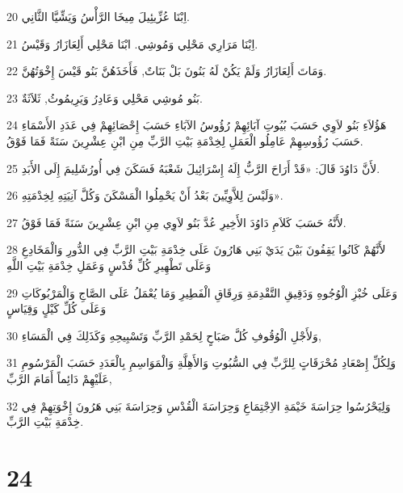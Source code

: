 \par 20 اِبْنَا عُزِّيئِيلَ مِيخَا الرَّأْسُ وَيَشِّيَّا الثَّانِي.
\par 21 اِبْنَا مَرَارِي مَحْلِي وَمُوشِي. ابْنَا مَحْلِي أَلِعَازَارُ وَقَيْسُ.
\par 22 وَمَاتَ أَلِعَازَارُ وَلَمْ يَكُنْ لَهُ بَنُونَ بَلْ بَنَاتٌ, فَأَخَذَهُنَّ بَنُو قَيْسَ إِخْوَتُهُنَّ.
\par 23 بَنُو مُوشِي مَحْلِي وَعَادِرُ وَيَرِيمُوثُ, ثَلاَثَةٌ.
\par 24 هَؤُلاَءِ بَنُو لاَوِي حَسَبَ بُيُوتِ آبَائِهِمْ رُؤُوسُ الآبَاءِ حَسَبَ إِحْصَائِهِمْ فِي عَدَدِ الأَسْمَاءِ حَسَبَ رُؤُوسِهِمْ عَامِلُو الْعَمَلِ لِخِدْمَةِ بَيْتِ الرَّبِّ مِنِ ابْنِ عِشْرِينَ سَنَةً فَمَا فَوْقُ.
\par 25 لأَنَّ دَاوُدَ قَالَ: «قَدْ أَرَاحَ الرَّبُّ إِلَهُ إِسْرَائِيلَ شَعْبَهُ فَسَكَنَ فِي أُورُشَلِيمَ إِلَى الأَبَدِ.
\par 26 وَلَيْسَ لِلاَّوِيِّينَ بَعْدُ أَنْ يَحْمِلُوا الْمَسْكَنَ وَكُلَّ آنِيَتِهِ لِخِدْمَتِهِ».
\par 27 لأَنَّهُ حَسَبَ كَلاَمِ دَاوُدَ الأَخِيرِ عُدَّ بَنُو لاَوِي مِنِ ابْنِ عِشْرِينَ سَنَةً فَمَا فَوْقُ.
\par 28 لأَنَّهُمْ كَانُوا يَقِفُونَ بَيْنَ يَدَيْ بَنِي هَارُونَ عَلَى خِدْمَةِ بَيْتِ الرَّبِّ فِي الدُّورِ وَالْمَخَادِعِ وَعَلَى تَطْهِيرِ كُلِّ قُدْسٍ وَعَمَلِ خِدْمَةِ بَيْتِ اللَّهِ
\par 29 وَعَلَى خُبْزِ الْوُجُوهِ وَدَقِيقِ التَّقْدِمَةِ وَرِقَاقِ الْفَطِيرِ وَمَا يُعْمَلُ عَلَى الصَّاجِ وَالْمَرْبُوكَاتِ وَعَلَى كُلِّ كَيْلٍ وَقِيَاسٍ
\par 30 وَلأَجْلِ الْوُقُوفِ كُلَّ صَبَاحٍ لِحَمْدِ الرَّبِّ وَتَسْبِيحِهِ وَكَذَلِكَ فِي الْمَسَاءِ,
\par 31 وَلِكُلِّ إِصْعَادِ مُحْرَقَاتٍ لِلرَّبِّ فِي السُّبُوتِ وَالأَهِلَّةِ وَالْمَوَاسِمِ بِالْعَدَدِ حَسَبَ الْمَرْسُومِ عَلَيْهِمْ دَائِماً أَمَامَ الرَّبِّ,
\par 32 وَلِيَحْرُسُوا حِرَاسَةَ خَيْمَةِ الاِجْتِمَاعِ وَحِرَاسَةَ الْقُدْسِ وَحِرَاسَةَ بَنِي هَرُونَ إِخْوَتِهِمْ فِي خِدْمَةِ بَيْتِ الرَّبِّ.

\chapter{24}

